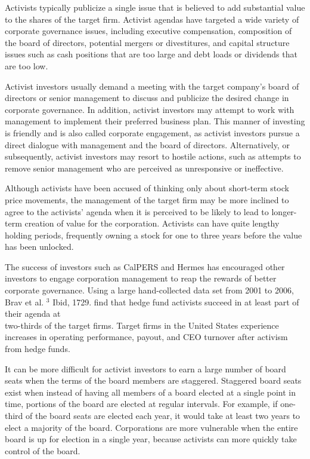 \documentclass[11pt]{article}
\begin{document}
Activists typically publicize a single issue that is believed to add substantial value to the shares of the target firm. Activist agendas have targeted a wide variety of corporate governance issues, including executive compensation, composition of the board of directors, potential mergers or divestitures, and capital structure issues such as cash positions that are too large and debt loads or dividends that are too low.

Activist investors usually demand a meeting with the target company's board of directors or senior management to discuss and publicize the desired change in corporate governance. In addition, activist investors may attempt to work with management to implement their preferred business plan. This manner of investing is friendly and is also called corporate engagement, as activist investors pursue a direct dialogue with management and the board of directors. Alternatively, or subsequently, activist investors may resort to hostile actions, such as attempts to remove senior management who are perceived as unresponsive or ineffective.

Although activists have been accused of thinking only about short-term stock price movements, the management of the target firm may be more inclined to agree to the activists' agenda when it is perceived to be likely to lead to longer-term creation of value for the corporation. Activists can have quite lengthy holding periods, frequently owning a stock for one to three years before the value has been unlocked.

The success of investors such as CalPERS and Hermes has encouraged other investors to engage corporation management to reap the rewards of better corporate governance. Using a large hand-collected data set from 2001 to 2006, Brav et al. ${ }^{3}$ Ibid, 1729. find that hedge fund activists succeed in at least part of their agenda at\\
two-thirds of the target firms. Target firms in the United States experience increases in operating performance, payout, and CEO turnover after activism from hedge funds.

It can be more difficult for activist investors to earn a large number of board seats when the terms of the board members are staggered. Staggered board seats exist when instead of having all members of a board elected at a single point in time, portions of the board are elected at regular intervals. For example, if one-third of the board seats are elected each year, it would take at least two years to elect a majority of the board. Corporations are more vulnerable when the entire board is up for election in a single year, because activists can more quickly take control of the board.
\end{document}
